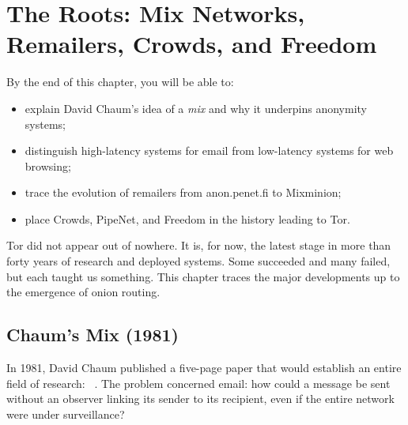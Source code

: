 \chapter{The Roots: Mix Networks, Remailers, Crowds, and Freedom}\label{cap:02-radici}

\begin{obiettivi}
By the end of this chapter, you will be able to:
\begin{itemize}[nosep]
  \item explain David Chaum's idea of a \emph{mix} and why it underpins anonymity systems;
  \item distinguish high-latency systems for email from low-latency systems for web browsing;
  \item trace the evolution of remailers from anon.penet.fi to Mixminion;
  \item place Crowds, PipeNet, and Freedom in the history leading to Tor.
\end{itemize}
\end{obiettivi}

Tor did not appear out of nowhere. It is, for now, the latest stage in more than forty years of research and deployed systems. Some succeeded and many failed, but each taught us something. This chapter traces the major developments up to the emergence of onion routing.

\section{Chaum's Mix (1981)}\label{sec:radici-chaum}

In 1981, David Chaum published a five-page paper that would establish an entire field of research: ~\cite{chaum1981untraceable}. The problem concerned email: how could a message be sent without an observer linking its sender to its recipient, even if the entire network were under surveillance?

